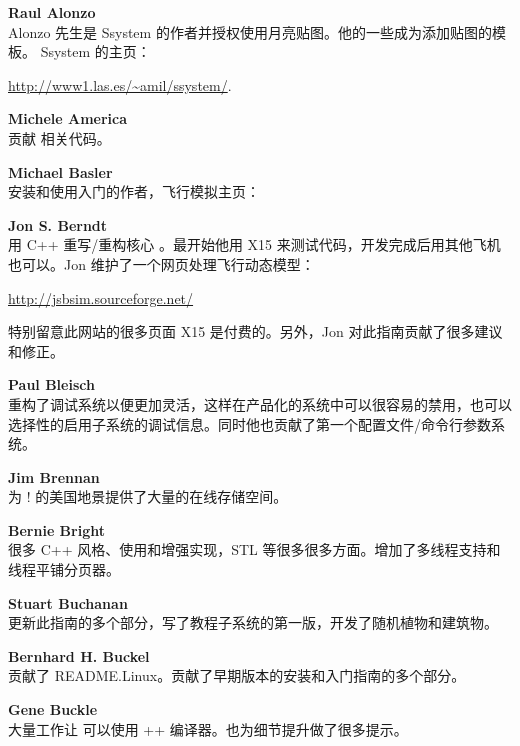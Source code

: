 \noindent \textbf{Raul Alonzo}\\
   Alonzo 先生是 Ssystem 的作者并授权使用月亮贴图。他的一些成为添加贴图的模板。
  Ssystem 的主页：
   \medskip
   
  \href{http://www1.las.es/~amil/ssystem/}{http://www1.las.es/\~{}amil/ssystem/}.
 \medskip
 
  \noindent \textbf{Michele America}\\
  贡献  相关代码。
 \medskip

\noindent \textbf{Michael Basler}\\
  安装和使用入门的作者，飞行模拟主页：
  \medskip

\medskip

\noindent \textbf{Jon S. Berndt}\\
 用 C++ 重写/重构核心 。最开始他用 X15 来测试代码，开发完成后用其他飞机也可以。Jon 维护了一个网页处理飞行动态模型：
   \medskip

  \href{http://jsbsim.sourceforge.net/}{http://jsbsim.sourceforge.net/}
   \medskip

\noindent
  特别留意此网站的很多页面 X15 是付费的。另外，Jon 对此指南贡献了很多建议和修正。
\medskip

\noindent \textbf{Paul Bleisch}\\
重构了调试系统以便更加灵活，这样在产品化的系统中可以很容易的禁用，也可以选择性的启用子系统的调试信息。同时他也贡献了第一个配置文件/命令行参数系统。
 \medskip

\noindent \textbf{Jim Brennan}\\
  为 \FlightGear{} $!$ 的美国地景提供了大量的在线存储空间。
 \medskip

\noindent \textbf{Bernie Bright}\\
很多 C++ 风格、使用和增强实现，STL 等很多很多方面。增加了多线程支持和线程平铺分页器。
 \medskip

\noindent \textbf{Stuart Buchanan}\\
更新此指南的多个部分，写了教程子系统的第一版，开发了随机植物和建筑物。
\medskip

\noindent \textbf{Bernhard H. Buckel}\\
贡献了 README.Linux。贡献了早期版本的安装和入门指南的多个部分。
 \medskip

\noindent \textbf{Gene Buckle}\\
大量工作让 \FlightGear{} 可以使用 ++ 编译器。也为细节提升做了很多提示。
 \medskip

